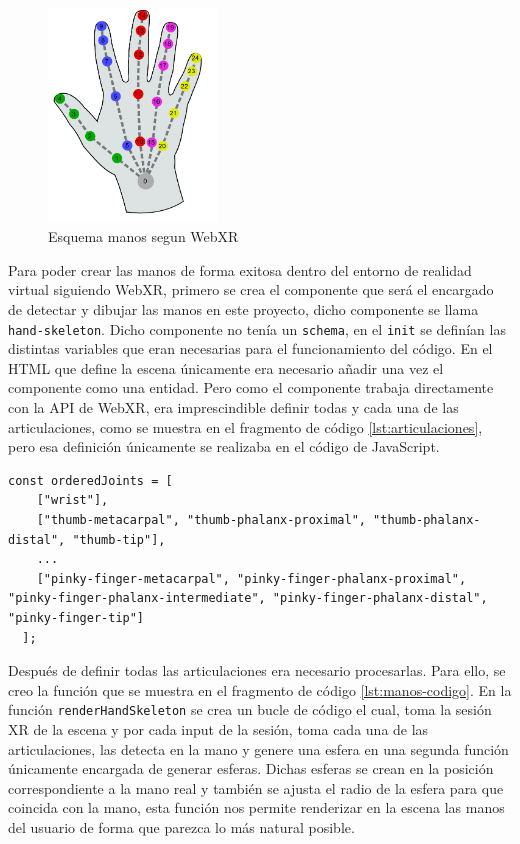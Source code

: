 \documentclass[a4paper, 12pt]{book}
\begin{document}
\begin{figure}[H] 
  \centering
  \includegraphics[width=0.4\textwidth]{img/webxr-mano.png} 
  \caption{Esquema manos segun WebXR}
  \label{fig:WebXR-manos}
\end{figure}

Para poder crear las manos de forma exitosa dentro del entorno de realidad virtual siguiendo WebXR, primero se crea el componente que será el encargado de detectar y dibujar las manos en este proyecto, dicho componente se llama \texttt{hand-skeleton}. Dicho componente no tenía un \texttt{schema}, en el \texttt{init} se definían las distintas variables que eran necesarias para el funcionamiento del código. 
En el HTML que define la escena únicamente era necesario añadir una vez el componente como una entidad. Pero como el componente trabaja directamente con la API de WebXR, era imprescindible definir todas y cada una de las articulaciones, como se muestra en el fragmento de código \ref{lst:articulaciones}, pero esa definición únicamente se realizaba en el código de JavaScript.
\begin{lstlisting}[caption=Definición de articulaciones, captionpos=b, label=lst:articulaciones]
  const orderedJoints = [
    ["wrist"],
    ["thumb-metacarpal", "thumb-phalanx-proximal", "thumb-phalanx-distal", "thumb-tip"],
    ...
    ["pinky-finger-metacarpal", "pinky-finger-phalanx-proximal", "pinky-finger-phalanx-intermediate", "pinky-finger-phalanx-distal", "pinky-finger-tip"]
  ];
\end{lstlisting}
Después de definir todas las articulaciones era necesario procesarlas. 
Para ello, se creo la función que se muestra en el fragmento de código \ref{lst:manos-codigo}. En la función \texttt{renderHandSkeleton} se crea un bucle de código el cual, toma la sesión XR de la escena y por cada input de la sesión, toma cada una de las articulaciones, las detecta en la mano y genere una esfera en una segunda función únicamente encargada de generar esferas. Dichas esferas se crean en la posición correspondiente a la mano real
y también se ajusta el radio de la esfera para que coincida con la mano, esta función nos permite renderizar en la escena las manos del usuario de forma que parezca lo más natural posible. 
\end{document}
